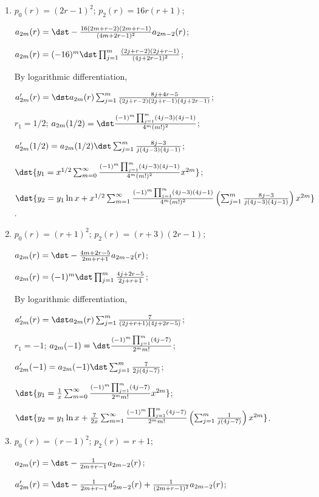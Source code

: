 \documentclass[openany]{book}
\newenvironment{sectionSolutions}{
 \begin{enumerate}[item-label={\thesection.\arabic{enumi}.}]
}{
 \end{enumerate}
}
\begin{document}
\begin{sectionSolutions}
$\dst{y_2=y_1\ln
x+\frac{13}{2}x^{-1/4}\sum_{m=1}^\infty\frac{(-1)^m\prod_{j=1}^m(8j-13)}{(32)^mm!}
\left(\sum_{j=1}^m\frac{1}{ j(8j-13)}\right)x^{2m}}$.


\item
$p_0(r)=(2r-1)^2$;
$p_2(r)=16r(r+1)$;

$a_{2m}(r)=\dst-\frac{16(2m+r-2)(2m+r-1)}{(4m+2r-1)^2}
a_{2m-2}(r)$;


$a_{2m}(r)=(-16)^m\dst\prod_{j=1}^m\frac{(2j+r-2)(2j+r-1)}{(4j+2r-1)^2}$;

By logarithmic differentiation,

$a_{2m}'(r)=\dst
a_{2m}(r)\sum_{j=1}^m\frac{8j+4r-5}{(2j+r-2)(2j+r-1)(4j+2r-1)}$;

$r_1=1/2$;
$a_{2m}(1/2)=\dst\frac{(-1)^m\prod_{j=1}^m(4j-3)(4j-1)}{4^m(m!)^2}$;

$a_{2m}'(1/2)=a_{2m}(1/2)\dst\sum_{j=1}^m\frac{8j-3}{ j(4j-3) (4j-1)}$;


$\dst{y_1=x^{1/2}\sum_{m=0}^\infty\frac{(-1)^m\prod_{j=1}^m(4j-3)(4j-1)}{4^m(m!)^2}
x^{2m}}$;

$\dst{y_2=y_1\ln
x+x^{1/2}\sum_{m=1}^\infty\frac{(-1)^m\prod_{j=1}^m(4j-3)(4j-1)}{4^m(m!)^2}
\left(\sum_{j=1}^m\frac{8j-3}{ j(4j-3) (4j-1)}\right)x^{2m}}$.


\item
$p_0(r)=(r+1)^2$;
$p_2(r)=(r+3)(2r-1)$;

$a_{2m}(r)=\dst-\frac{4m+2r-5}{2m+r+1}
a_{2m-2}(r)$;

 $a_{2m}(r)=(-1)^m\dst\prod_{j=1}^m\frac{4j+2r-5}{2j+r+1}$;

By logarithmic differentiation,

$a_{2m}'(r)=\dst a_{2m}(r)\sum_{j=1}^m\frac{7}{(2j+r+1)(4j+2r-5)}$;

$r_1=-1$;
$a_{2m}(-1)=\dst\frac{(-1)^m\prod_{j=1}^m(4j-7)}{2^mm!}$;

$a_{2m}'(-1)=a_{2m}(-1)\dst\sum_{j=1}^m\frac{7}{2j(4j-7)}$;

$\dst{y_1=\frac{1}{ x
}\sum_{m=0}^\infty\frac{(-1)^m\prod_{j=1}^m(4j-7)}{2^mm!} x^{2m}}$;

$\dst{y_2=y_1\ln
x+\frac{7}{2x}\sum_{m=1}^\infty\frac{(-1)^m\prod_{j=1}^m(4j-7)}{2^mm!}
\left(\sum_{j=1}^m\frac{1}{ j(4j-7)}\right)x^{2m}}$.


\item
$p_0(r)=(r-1)^2$;
$p_2(r)=r+1$;

$a_{2m}(r)=\dst-\frac{1}{2m+r-1}a_{2m-2}(r)$;


$a_{2m}'(r)=\dst
-\frac{1}{2m+r-1}a_{2m-2}'(r)+\frac{1}{(2m+r-1)^2}a_{2m-2}(r)$;


\end{sectionSolutions}
\end{document}
